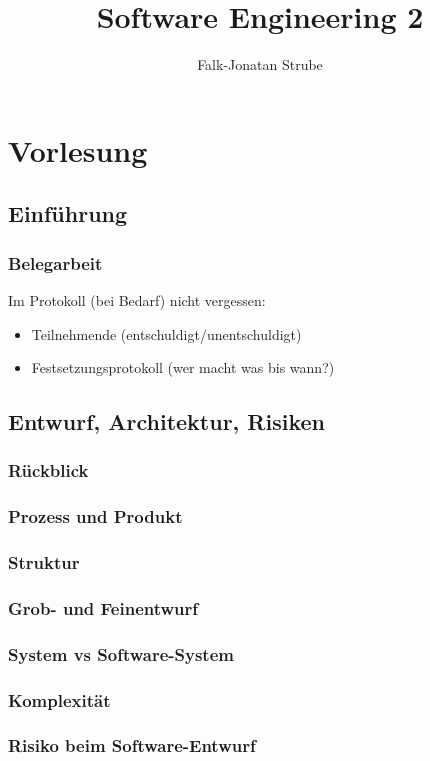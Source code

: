 \documentclass{scrreprt}
\title{Software Engineering 2}
\author{Falk-Jonatan Strube}
\begin{document}
\maketitle
\tableofcontents
\part{Vorlesung}
\chapter*{Einführung}
\section*{Belegarbeit}
Im Protokoll (bei Bedarf) nicht vergessen:
\begin{itemize}
\item Teilnehmende (entschuldigt/unentschuldigt)
\item Festsetzungsprotokoll (wer macht was bis wann?)
\end{itemize}
\chapter{Entwurf, Architektur, Risiken}
\section{Rückblick}
\section{Prozess und Produkt}
\section{Struktur}
\section{Grob- und Feinentwurf}
\section{System vs Software-System}
\section{Komplexität}
\section{Risiko beim Software-Entwurf}
\end{document}
